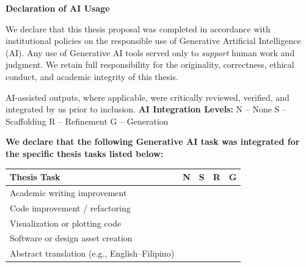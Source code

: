 


\newcommand{\yes}{\ding{51}}


\clearpage
\thispagestyle{empty}    
\begin{center}
    {\Large \textbf{Declaration of AI Usage}}\\[1.5em]
\end{center}

\noindent
We declare that this thesis proposal was completed in accordance with institutional policies on the responsible use of Generative Artificial Intelligence (AI). Any use of Generative AI tools served only to \emph{support} human work and judgment. We retain full responsibility for the originality, correctness, ethical conduct, and academic integrity of this thesis.

\noindent
AI-assisted outputs, where applicable, were critically reviewed, verified, and integrated by us prior to inclusion.
\textbf{AI Integration Levels:}
N – None \quad
S – Scaffolding \quad
R – Refinement \quad
G – Generation

\medskip
\noindent
\textbf{We declare that the following Generative AI task was integrated for the specific thesis tasks listed below:}

\renewcommand{\arraystretch}{1.15}
\begin{tabular}{p{} | c | c | c | c}
\toprule
\textbf{Thesis Task} & \textbf{N} & \textbf{S} & \textbf{R} & \textbf{G} \\ \midrule
Academic writing improvement &  & \yes  & \yes &  \\ \hline
Code improvement / refactoring &  & \yes  &  &  \\ \hline
Visualization or plotting code &  & \yes  &  & \yes \\ \hline
Software or design asset creation &  &  \yes &  &  \\ \hline
Abstract translation (e.g., English--Filipino) &  &  &  & \yes \\ \hline
\end{tabular}

